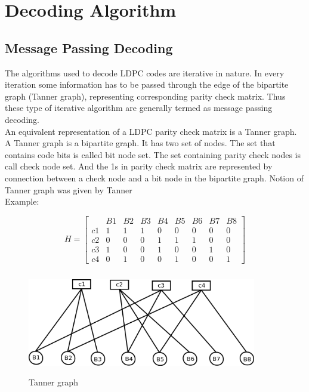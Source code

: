 
\chapter{Decoding Algorithm} 

\label{Chapter3} 


\section{Message Passing Decoding}


The algorithms used to decode LDPC codes are iterative in nature. In every iteration some information has to be passed through the edge of the bipartite graph (Tanner graph), representing corresponding parity check matrix. Thus these type of iterative algorithm are generally termed as message passing decoding\cite{9}.\\

An equivalent representation of a LDPC parity check matrix is a Tanner graph. A Tanner graph is a bipartite graph. It has two set of nodes. The set that contains code bits is called bit node set. The set containing parity check nodes is call check node set. And the 1s in parity check matrix are represented by connection between a check node and a bit node in the bipartite graph. Notion of Tanner graph was given by Tanner \\
Example:


\[
 H =  \left[ \begin{array} {c|cccccccc} 
  &    B1 &   B2 &   B3 &  B4  &  B5  &  B6  &  B7  &  B8 \\ \hline
c1 &    1  &   1  &   1  &   0  &   0  &   0  &   0  &   0 \\
c2 &    0  &   0  &   0  &   1  &   1  &   1  &   0  &   0 \\ 
c3 &    1  &   0  &   0  &   1  &   0  &   0  &   1  &   0 \\
c4 &    0  &   1  &   0  &   0  &   1  &   0  &   0  &   1 \end{array} \right] 
\]			

\begin{figure}[h!]
\centering
\includegraphics[height=4.5cm,width=10cm]{minSum1}
\caption[Tanner graph]{Tanner graph}
\end{figure}

